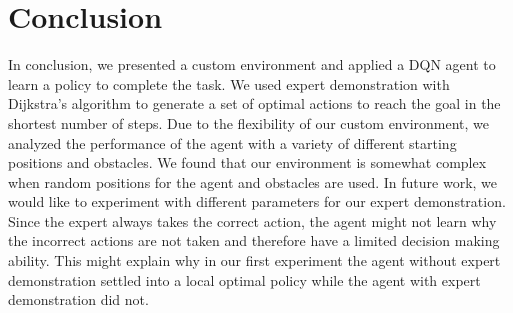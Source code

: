 \documentclass[conference]{IEEEtran}
\begin{document}
\section{Conclusion}
In conclusion, we presented a custom environment and applied a DQN agent to
learn a policy to complete the task. We used expert demonstration with
Dijkstra's algorithm to generate a set of optimal actions to reach the goal in
the shortest number of steps. Due to the flexibility of our custom environment,
we analyzed the performance of the agent with a variety of different starting
positions and obstacles. We found that our environment is somewhat complex when
random positions for the agent and obstacles are used. In future work, we would
like to experiment with different parameters for our expert demonstration. Since
the expert always takes the correct action, the agent might not learn why the
incorrect actions are not taken and therefore have a limited decision making
ability. This might explain why in our first experiment the agent without expert
demonstration settled into a local optimal policy while the agent with expert
demonstration did not.



\end{document}
